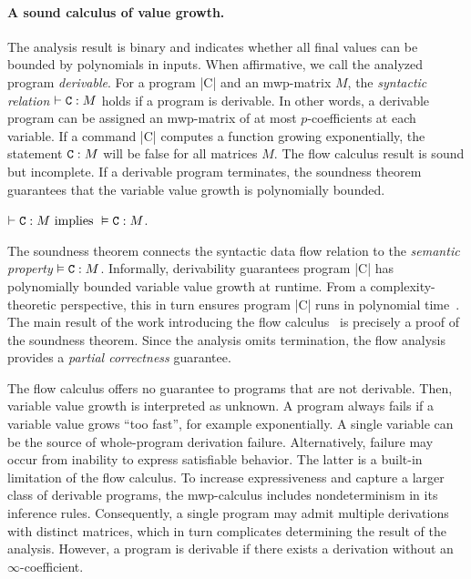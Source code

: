 \paragraph*{A sound calculus of value growth.}
The analysis result is binary and indicates whether all final values can be bounded by polynomials in inputs.
When affirmative, we call the analyzed program \emph{derivable}.
For a program \pr|C| and an mwp-matrix \(M\),
the \emph{syntactic relation} \(\vdash \prm{C} : M\) holds if a program is derivable.
In other words, a derivable program can be assigned an mwp-matrix of at most $p$-coefficients at each variable.
If a command \pr|C| computes a function growing exponentially, the statement \(\prm{C} : M\) will be false for all matrices \(M\).
The flow calculus result is sound but incomplete.
If a derivable program terminates,
the soundness theorem~\cite[p. 11]{jones2009} guarantees that the variable value growth is polynomially bounded.

\begin{theorem}\label{mwp-soundness}
\(\vdash \prm{C} : M \text{ implies } \vDash \prm{C} : M \).
\end{theorem}

The soundness theorem connects the syntactic data flow relation to the \emph{semantic property} \(\vDash \prm{C} : M\).
Informally, derivability guarantees program \pr|C| has polynomially bounded variable value growth at runtime.
From a complexity-theoretic perspective, this in turn ensures program \pr|C| runs in polynomial time~\cite{kristiansen2017}.
The main result of the work introducing the flow calculus~\cite{jones2009} is precisely a proof of the soundness theorem.
Since the analysis omits termination,
the flow analysis provides a \emph{partial correctness} guarantee.

The flow calculus offers no guarantee to programs that are not derivable.
Then, variable value growth is interpreted as unknown.
A program always fails if a variable value grows \enquote{too fast}, for example exponentially.
A single variable can be the source of whole-program derivation failure.
Alternatively, failure may occur from inability to express satisfiable behavior.
The latter is a built-in limitation of the flow calculus.
To increase expressiveness and capture a larger class of derivable programs,
the mwp-calculus includes nondeterminism in its inference rules.
Consequently, a single program may admit multiple derivations with distinct matrices, which in turn complicates determining the result of the analysis.
However, a program is derivable if there exists a derivation without an \(\infty\)-coefficient.

